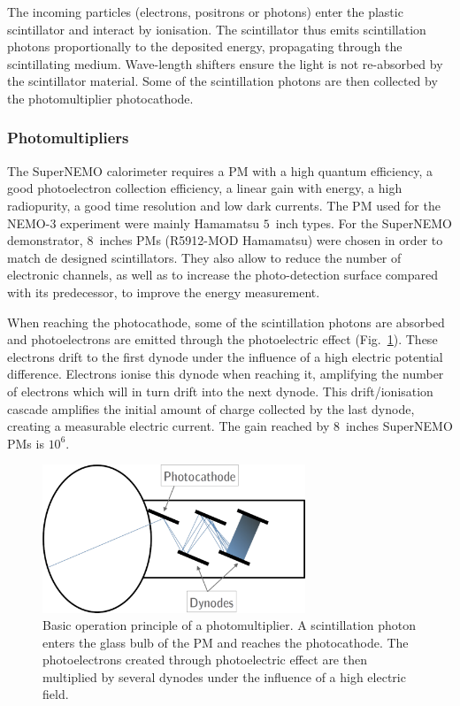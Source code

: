 The incoming particles (electrons, positrons or photons) enter the plastic scintillator and interact by ionisation.
The scintillator thus emits scintillation photons proportionally to the deposited energy, propagating through the scintillating medium.
Wave-length shifters ensure the light is not re-absorbed by the scintillator material.
Some of the scintillation photons are then collected by the photomultiplier photocathode.


\subsubsection*{Photomultipliers}

The SuperNEMO calorimeter requires a PM with a high quantum efficiency, a good photoelectron collection efficiency, a linear gain with energy, a high radiopurity, a good time resolution and low dark currents.
The PM used for the NEMO-$3$ experiment were mainly Hamamatsu $5$~inch types.
For the SuperNEMO demonstrator, $8$~inches PMs (R5912-MOD Hamamatsu) were chosen in order to match de designed scintillators.
They also allow to reduce the number of electronic channels, as well as to increase the photo-detection surface compared with its predecessor, to improve the energy measurement.

When reaching the photocathode, some of the scintillation photons are absorbed and photoelectrons are emitted through the photoelectric effect (Fig.~\ref{fig:PMT_design}).
These electrons drift to the first dynode under the influence of a high electric potential difference.
Electrons ionise this dynode when reaching it, amplifying the number of electrons which will in turn drift into the next dynode.
This drift/ionisation cascade amplifies the initial amount of charge collected by the last dynode, creating a measurable electric current.
The gain reached by $8$~inches SuperNEMO PMs is $10^{6}$.
\begin{figure}[h!]
\centering
\includegraphics[width=0.7\textwidth]{SNdemonstrator/fig_SNdemonstrator/PMT_plan.pdf}
\caption{Basic operation principle of a photomultiplier.
  A scintillation photon enters the glass bulb of the PM and reaches the photocathode.
  The photoelectrons created through photoelectric effect are then multiplied by several dynodes under the influence of a high electric field.
\label{fig:PMT_design}}
\end{figure}

